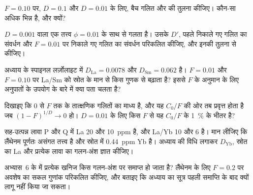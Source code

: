 \begin{exercise}[$\star\star$]\label{exo:b3:trace-element-modelling:7}
$F = 0.10$ पर, $D = 0.1$ और $D = 0.01$ के लिए, बैच गलित और  की तुलना कीजिए।
कौन-सा अधिक भिन्न है, और क्यों?
\end{exercise}

\begin{exercise}[$\star\star$]\label{exo:b3:trace-element-modelling:8}
$D = 0.001$ वाला एक तत्त्व $\phi = 0.01$ के साथ  से गलता है।
उसके $D'$, पहले निकाले गए गलित का संवर्धन और $F = 0.01$ पर निकाले गए गलित का संवर्धन
परिकलित कीजिए, और इनकी तुलना  से कीजिए।
\end{exercise}

\begin{exercise}[$\star\star$]\label{exo:b3:trace-element-modelling:9}
अध्याय के स्पाइनल लर्ज़ोलाइट में $D_{\mathrm{La}} = 0.0078$ और
$D_{\mathrm{Sm}} = 0.062$ है। $F = 0.01$ और $F = 0.10$ पर  La/Sm को स्रोत के मान से
किस गुणक से बढ़ाता है? इससे
$F$ के अनुमान के लिए अनुपातों के उपयोग के बारे में क्या पता चलता है?
\end{exercise}

\begin{exercise}[$\star\star\star$]\label{exo:b3:trace-element-modelling:10}
दिखाइए कि  0 से $F$ तक के तात्क्षणिक गलितों का माध्य है,
और यह $C_0/F$ की ओर तब प्रवृत्त होता है जब $(1 - F)^{1/D} \to 0$ हो। $D = 0.01$ के लिए
किस $F$ से यह $C_0/F$ के \qty{1}{\percent} के भीतर है?
\end{exercise}

\begin{exercise}[$\star\star\star$]\label{exo:b3:trace-element-modelling:11}
सह-उत्पन्न लावा P और Q में La 20 और \qty{10}{ppm} है, और La/Yb 10 और 6 है।
मान लीजिए कि लैंथेनम पूर्णतः असंगत तत्त्व है और स्रोत में
\qty{0.44}{ppm} Yb है। अध्याय की विधि लगाकर $D_{\mathrm{Yb}}$,
स्रोत का La और प्रत्येक लावा का गलन-अंश ज्ञात कीजिए।
\end{exercise}

\begin{exercise}[$\star\star\star$]\label{exo:b3:trace-element-modelling:12}
अभ्यास~6 के  में प्रत्येक खनिज किस गलन-अंश पर
समाप्त हो जाता है? लैंथेनम के लिए $F = 0.2$ पर अवशेष का सकल गुणांक परिकलित कीजिए,
और बताइए कि अध्याय का सूत्र पहली समाप्ति के बाद
क्यों लागू नहीं किया जा सकता।
\end{exercise}


